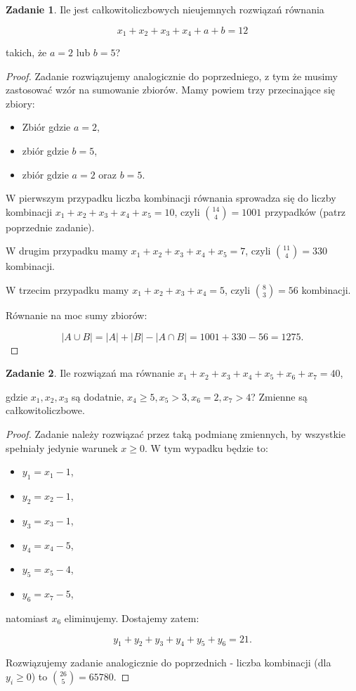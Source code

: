 \documentclass[11pt]{article}
\theoremstyle{definition}
\newtheorem{zadanie}{Zadanie}
\numberwithin{zadanie}{subsection}
\begin{document}
\begin{zadanie}
    Ile jest całkowitoliczbowych nieujemnych rozwiązań równania

    $$x_1+x_2+x_3+x_4+a+b = 12$$

    takich, że $a=2$ lub $b=5$?
\end{zadanie}
\begin{proof}
    Zadanie rozwiązujemy analogicznie do poprzedniego, z tym że musimy zastosować wzór na sumowanie zbiorów. Mamy powiem trzy przecinające się zbiory:

    \begin{itemize}
        \item Zbiór gdzie $a=2$,
        \item zbiór gdzie $b=5$,
        \item zbiór gdzie $a=2$ oraz $b=5$.
    \end{itemize}

    W pierwszym przypadku liczba kombinacji równania sprowadza się do liczby kombinacji $x_1+x_2+x_3+x_4+x_5=10$, czyli $\binom{14}{4} = 1001$ przypadków (patrz poprzednie zadanie).

    W drugim przypadku mamy $x_1+x_2+x_3+x_4+x_5=7$, czyli $\binom{11}4 = 330$ kombinacji.

    W trzecim przypadku mamy $x_1+x_2+x_3+x_4 = 5$, czyli $\binom{8}{3} = 56$ kombinacji.

    Równanie na moc sumy zbiorów:

    $$|A\cup B| = |A| + |B| - |A\cap B| = 1001 + 330 - 56 = 1275.$$

\end{proof}

\begin{zadanie}
    Ile rozwiązań ma równanie $x_1+x_2+x_3+x_4+x_5+x_6+x_7= 40$,

    gdzie $x_1, x_2, x_3$ są dodatnie, $x_4\geq5, x_5>3, x_6=2, x_7>4$? Zmienne są całkowitoliczbowe.
\end{zadanie}

\begin{proof}
    Zadanie należy rozwiązać przez taką podmianę zmiennych, by wszystkie spełniały jedynie warunek $x\geq 0$. W tym wypadku będzie to:
    \begin{itemize}
        \item $y_1=x_1-1$,
        \item $y_2=x_2-1$,
        \item $y_3=x_3-1$,
        \item $y_4=x_4-5$,
        \item $y_5=x_5-4$,
        \item $y_6=x_7-5$,
    \end{itemize}
    natomiast $x_6$ eliminujemy. Dostajemy zatem:

    $$y_1+y_2+y_3+y_4+y_5+y_6 = 21.$$

    Rozwiązujemy zadanie analogicznie do poprzednich - liczba kombinacji (dla $y_i\geq0$) to $\binom{26}{5} = 65780$.
\end{proof}
\end{document}
